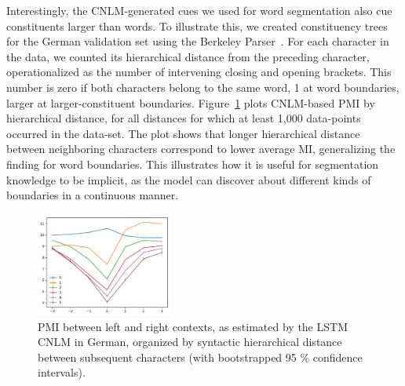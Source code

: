 Interestingly, the CNLM-generated cues we used for word segmentation
also cue constituents larger than words. To illustrate this, we created constituency trees for the German
validation set using the Berkeley Parser~\cite{petrov2007improved}.
For each character in the data, we counted its hierarchical distance
from the preceding character, operationalized as the number of
intervening closing and opening brackets.  This number is zero if both characters belong to the same word, 1 at word
boundaries, larger at larger-constituent boundaries. Figure~\ref{fig:syntax-depth} plots CNLM-based PMI by
hierarchical distance, for all distances for which at least 1,000
data-points occurred in the data-set.  The plot shows that longer
hierarchical distance between neighboring characters correspond to
lower average MI, generalizing the finding for word boundaries.  This
illustrates how it is useful for segmentation knowledge to be
implicit, as the model can discover about different kinds of
boundaries in a continuous manner.

\begin{figure}
  \center
\includegraphics[width=0.4\textwidth]{figures/segmentation-profile-pmis-german-all-heights-ci.pdf}
\caption{PMI between left and right contexts, as estimated by the LSTM CNLM in German, organized by syntactic hierarchical distance between subsequent characters (with bootstrapped 95 \% confidence intervals).}\label{fig:syntax-depth}
\end{figure}





